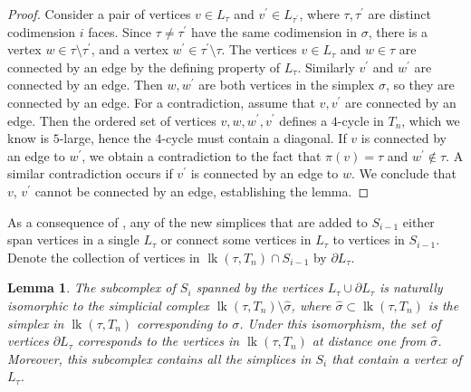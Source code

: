 \documentclass[12pt, letterpaper]{article}
\newcommand{\lk}{\operatorname{lk}}
\theoremstyle{plain}
\newtheorem{lem}[thm]{Lemma}
\theoremstyle{definition}
\begin{document}
\begin{proof}
Consider a pair of vertices $v\in L_\tau$ and $v^\prime \in L_{\tau^\prime}$, where $\tau, \tau^\prime$ are distinct codimension $i$ faces. Since $\tau \neq \tau^\prime$ have the same codimension in $\sigma$, there is a vertex $w\in \tau\setminus \tau^\prime$, and a vertex $w^\prime\in \tau^\prime\setminus \tau$. The vertices $v\in L_\tau$ and $w\in \tau$ are connected by an edge by the defining property of $L_\tau$. Similarly $v^\prime$ and $w^\prime$ are connected by an edge. Then $w,w^\prime$ are both vertices in the simplex $\sigma$, so they are connected by an edge. For a contradiction, assume that $v, v^\prime$ are connected by an edge. Then the ordered set of vertices $v,w,w^\prime,v^\prime$ defines a $4$-cycle in $T_n$, which we know is $5$-large, hence the $4$-cycle must contain a diagonal. If $v$ is connected by an edge to $w^\prime$, we obtain a contradiction to the fact that $\pi(v)=\tau$ and $w^\prime\notin \tau$. A similar contradiction occurs if $v^\prime$ is connected by an edge to $w$. We conclude that $v$, $v^\prime$ cannot be connected by an edge, establishing the lemma.
\end{proof}

As a consequence of , any of the new simplices that are added to $S_{i-1}$ either span vertices in a single $L_\tau$ or connect some vertices in $L_\tau$ to vertices in $S_{i-1}$. Denote the collection of vertices in $\lk(\tau, T_n)\cap S_{i-1}$ by $\partial L_\tau$.
 
\begin{lem}\label{lem:chunks-come-from-links}
    The subcomplex of $S_i$ spanned by the vertices $L_\tau \cup \partial L_\tau$ is naturally isomorphic to the simplicial complex $\lk(\tau, T_n) \setminus \hat \sigma$, where $\hat \sigma \subset \lk(\tau, T_n)$ is the simplex in $\lk(\tau, T_n)$ corresponding to $\sigma$. Under this isomorphism, the set of vertices $\partial L_\tau$ corresponds to the vertices in $\lk(\tau, T_n)$ at distance one from $\hat \sigma$. Moreover, this subcomplex contains all the simplices in $S_i$ that contain a vertex of $L_\tau$.
\end{lem}
 
\end{document}
